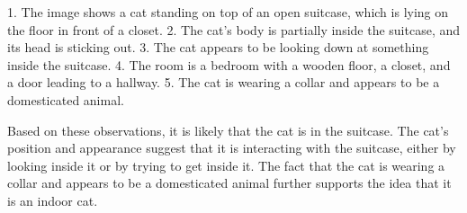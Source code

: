 \begin{enumerate}
        1. The image shows a cat standing on top of an open suitcase, which is lying on the floor in front of a closet.
        2. The cat’s body is partially inside the suitcase, and its head is sticking out.
        3. The cat appears to be looking down at something inside the suitcase.
        4. The room is a bedroom with a wooden floor, a closet, and a door leading to a hallway.
        5. The cat is wearing a collar and appears to be a domesticated animal.
        
        Based on these observations, it is likely that the cat is in the suitcase. The cat’s position and appearance suggest that it is interacting with the suitcase, either by looking inside it or by trying to get inside it. The fact that the cat is wearing a collar and appears to be a domesticated animal further supports the idea that it is an indoor cat.
    \end{enumerate}

